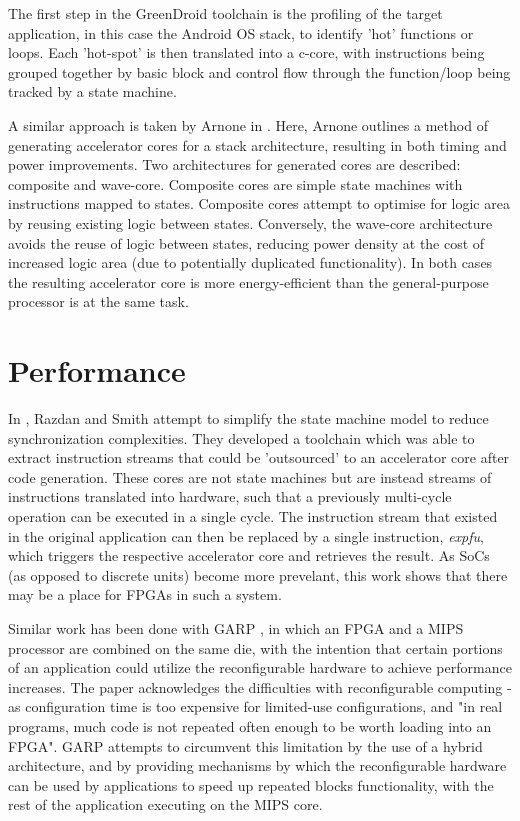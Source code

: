 \documentclass{UoYCSproject}
\begin{document}
The first step in the GreenDroid toolchain is the profiling of the target application, in this case the
Android OS stack, to identify 'hot' functions or loops. Each 'hot-spot' is then translated into a c-core,
with instructions being grouped together by basic block and control flow through the function/loop being
tracked by a state machine.

A similar approach is taken by Arnone in \cite{arnone-thesis}. Here, Arnone outlines a method of
generating accelerator cores for a stack architecture, resulting in both timing
and power improvements. Two architectures for generated cores are described: composite and wave-core.
Composite cores are simple state machines with instructions mapped to states. Composite cores attempt to
optimise for logic area by reusing existing logic between states. Conversely, the wave-core
architecture avoids the reuse of logic between states, reducing power density at the cost of increased
logic area (due to potentially duplicated functionality). In both cases the resulting accelerator core is
more energy-efficient than the general-purpose processor is at the same task.

\section{Performance}

In \cite{high-performance-microarchitecture}, Razdan and Smith attempt to simplify the state machine model
to reduce synchronization complexities. They developed a toolchain which was able to extract instruction
streams that could be 'outsourced' to an accelerator core after code generation. These cores are not state
machines but are instead streams of instructions translated into hardware, such that a previously
multi-cycle operation can be executed in a single cycle. The instruction stream that existed in the
original application can then be replaced by a single instruction, \textit{expfu}, which triggers
the respective accelerator core and retrieves the result. As SoCs (as opposed to discrete units) become
more prevelant, this work shows that there may be a place for FPGAs in such a system.

Similar work has been done with GARP \cite{garp}, in which an FPGA and a MIPS processor are combined on the
same die, with the intention that certain portions of an application could utilize the reconfigurable
hardware to achieve performance increases. The paper acknowledges the difficulties with reconfigurable
computing - as configuration time is too expensive for limited-use configurations, and "in real programs,
much code is not repeated often enough to be worth loading into an FPGA". GARP attempts to circumvent this
limitation by the use of a hybrid architecture, and by providing mechanisms by which the reconfigurable
hardware can be used by applications to speed up repeated blocks functionality, with the rest of the
application executing on the MIPS core.

\printbibliography
\end{document}

